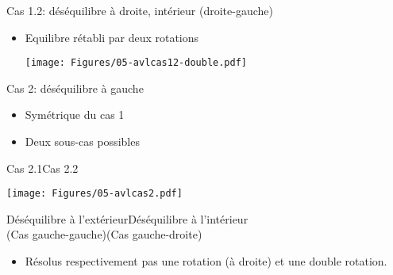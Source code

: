 \begin{frame}{Cas 1.2: déséquilibre à droite, intérieur (droite-gauche)}
\begin{itemize}
\item Equilibre rétabli par deux rotations

\begin{center}
\texttt{[image: Figures/05-avlcas12-double.pdf]}
\end{center}

\end{itemize}

\end{frame}

\begin{frame}{Cas 2: déséquilibre à gauche}
\begin{itemize}
\item Symétrique du cas 1
\item Deux sous-cas possibles
\end{itemize}

\begin{center}
Cas 2.1\hspace{4cm}Cas 2.2

\medskip

\texttt{[image: Figures/05-avlcas2.pdf]}

\medskip
Déséquilibre à l'extérieur\hspace{1.3cm}Déséquilibre à l'intérieur\\
(Cas gauche-gauche)\hspace{2cm}(Cas gauche-droite)
\end{center}

\begin{itemize}
\item Résolus respectivement pas une rotation (à droite) et une double rotation.
\end{itemize}

\end{frame}

